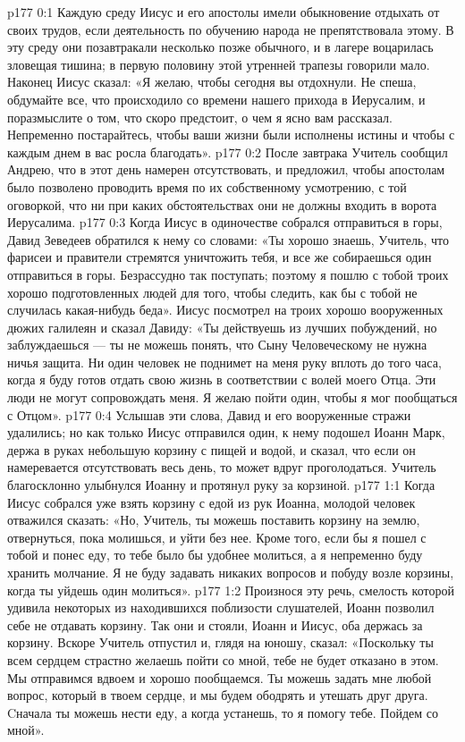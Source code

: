 \vs p177 0:1 Каждую среду Иисус и его апостолы имели обыкновение отдыхать от своих трудов, если деятельность по обучению народа не препятствовала этому. В эту среду они позавтракали несколько позже обычного, и в лагере воцарилась зловещая тишина; в первую половину этой утренней трапезы говорили мало. Наконец Иисус сказал: «Я желаю, чтобы сегодня вы отдохнули. Не спеша, обдумайте все, что происходило со времени нашего прихода в Иерусалим, и поразмыслите о том, что скоро предстоит, о чем я ясно вам рассказал. Непременно постарайтесь, чтобы ваши жизни были исполнены истины и чтобы с каждым днем в вас росла благодать».
\vs p177 0:2 После завтрака Учитель сообщил Андрею, что в этот день намерен отсутствовать, и предложил, чтобы апостолам было позволено проводить время по их собственному усмотрению, с той оговоркой, что ни при каких обстоятельствах они не должны входить в ворота Иерусалима.
\vs p177 0:3 Когда Иисус в одиночестве собрался отправиться в горы, Давид Зеведеев обратился к нему со словами: «Ты хорошо знаешь, Учитель, что фарисеи и правители стремятся уничтожить тебя, и все же собираешься один отправиться в горы. Безрассудно так поступать; поэтому я пошлю с тобой троих хорошо подготовленных людей для того, чтобы следить, как бы с тобой не случилась какая\hyp{}нибудь беда». Иисус посмотрел на троих хорошо вооруженных дюжих галилеян и сказал Давиду: «Ты действуешь из лучших побуждений, но заблуждаешься --- ты не можешь понять, что Сыну Человеческому не нужна ничья защита. Ни один человек не поднимет на меня руку вплоть до того часа, когда я буду готов отдать свою жизнь в соответствии с волей моего Отца. Эти люди не могут сопровождать меня. Я желаю пойти один, чтобы я мог пообщаться с Отцом».
\vs p177 0:4 Услышав эти слова, Давид и его вооруженные стражи удалились; но как только Иисус отправился один, к нему подошел Иоанн Марк, держа в руках небольшую корзину с пищей и водой, и сказал, что если он намеревается отсутствовать весь день, то может вдруг проголодаться. Учитель благосклонно улыбнулся Иоанну и протянул руку за корзиной.
\vs p177 1:1 Когда Иисус собрался уже взять корзину с едой из рук Иоанна, молодой человек отважился сказать: «Но, Учитель, ты можешь поставить корзину на землю, отвернуться, пока молишься, и уйти без нее. Кроме того, если бы я пошел с тобой и понес еду, то тебе было бы удобнее молиться, а я непременно буду хранить молчание. Я не буду задавать никаких вопросов и побуду возле корзины, когда ты уйдешь один молиться».
\vs p177 1:2 Произнося эту речь, смелость которой удивила некоторых из находившихся поблизости слушателей, Иоанн позволил себе не отдавать корзину. Так они и стояли, Иоанн и Иисус, оба держась за корзину. Вскоре Учитель отпустил и, глядя на юношу, сказал: «Поскольку ты всем сердцем страстно желаешь пойти со мной, тебе не будет отказано в этом. Мы отправимся вдвоем и хорошо пообщаемся. Ты можешь задать мне любой вопрос, который в твоем сердце, и мы будем ободрять и утешать друг друга. Cначала ты можешь нести еду, а когда устанешь, то я помогу тебе. Пойдем со мной».
